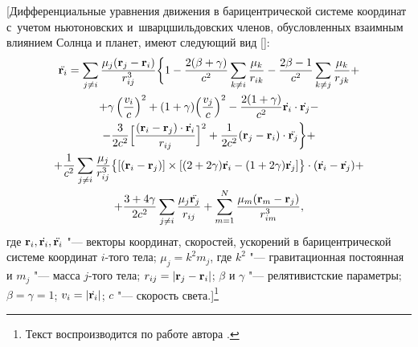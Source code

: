 [Дифференциальные уравнения движения в барицентрической системе координат с~учетом ньютоновских и~шварцшильдовских членов, обусловленных взаимным влиянием Солнца и планет, имеют следующий вид []:
\begin{multline}
\label{zaus:eq6}
 \ddot{ {\bf r}_i }= \sum_{j \neq  i} \frac{ \mu_j({\bf r}_j-{\bf r}_i) }{r_{ij}^3}
\biggl\{ 1-\frac{2(\beta+ \gamma) }{c^2} \sum_{k \neq  i} \frac{
\mu_k}{r_{ik}}-\frac{2\beta-1}{c^2}\sum_{k \neq  j} \frac{
\mu_k}{r_{jk}}+ 
\\
 +\gamma\left( \frac{v_i}{c} \right)^2+ (1+\gamma)\Bigl(
\frac{v_j}{c} \Bigr)^2-\frac{2(1+\gamma)}{c^2}\dot{{\bf r}_i}\cdot
\dot{{\bf r}_j} - 
\\
-
\frac{3}{2c^2}\Bigl[ \frac{({\bf r}_i-{\bf r}_j)
\cdot \dot{{\bf r}_i} }{r_{ij}} \Bigr]^2+
\frac1{2c^2}({\bf r}_j-{\bf r}_i) \cdot \ddot{{\bf r}_j} \biggr\}+
\\
+
\frac1{c^2}\sum_{j \neq  i} \frac{\mu_j}{r_{ij}^3}\bigl\{ \left[
({\bf r}_i-{\bf r}_j)\right] \times \left[
(2+2\gamma)\dot{{\bf r}_i}-(1+2\gamma)\dot{{\bf r}_j}\right]\bigr\}\cdot
(\dot{{\bf r}_i}-\dot{{\bf r}_j})+ \\
+ \frac{3+4\gamma}{2c^2} \sum_{j
\neq  i}\frac{ \mu_j \ddot{{\bf r}_j}}{r_{ij}}+\sum_{m=1}^N\frac{\mu_m({\bf r}_m-{\bf r}_j)}{r_{im}^3},
\end{multline}
где ${\bf r}_i, \dot{{\bf r}_i}, \ddot{{\bf r}_i}$ "--- векторы координат, скоростей, ускорений в барицентрической системе координат $i$-того тела; 
$\mu_j=k^2 m_j$, где $k^2$ "--- гравитационная постоянная и $m_j$ "--- масса $j$-того тела; 
$r_{ij}=|{\bf r}_j-{\bf r}_i|$; $\beta$ и $\gamma$ "--- релятивистские параметры; $\beta = \gamma = 1$; $v_i=|\dot{{\bf r}_i}|$; $c$ "--- скорость света.]\footnote{Текст воспроизводится  по работе автора \cite{Zau07}.}


